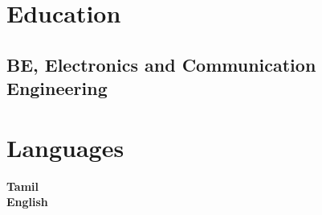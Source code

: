 \documentclass[11pt]{plushcv}
\begin{document}
\begin{minipage}[t]{0.58\textwidth} 
\section{Education}
\fontsize{11pt}{13pt}\selectfont %
\subsection{BE, Electronics and Communication Engineering}
\end{minipage} 
\hfill
\begin{minipage}[t]{0.38\textwidth} 
\section{Languages}
\fontsize{11pt}{13pt}\selectfont %
\textbf{Tamil}  \\
\textbf{English}
\end{minipage} 
\end{document}
